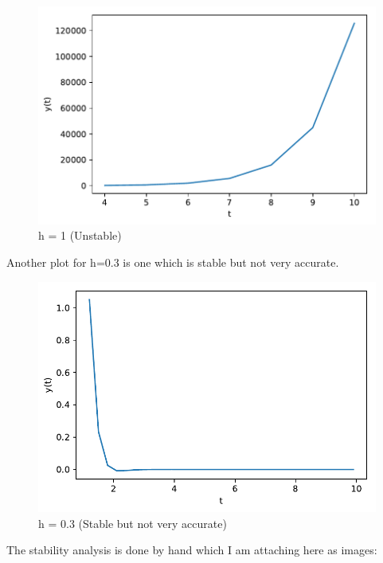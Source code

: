 \documentclass[12pt,letterpaper]{article}
\begin{document}
\begin{figure}[H]
\centering
\includegraphics[scale=0.65]{"../h=1"}
\caption{h = 1 (Unstable)}
\end{figure}

Another plot for h=0.3 is one which is stable but not very accurate.

\begin{figure}[H]
\centering
\includegraphics[scale=0.65]{"../h=03"}
\caption{h = 0.3 (Stable but not very accurate)}
\end{figure}

The stability analysis is done by hand which I am attaching here as images:
\end{document}
